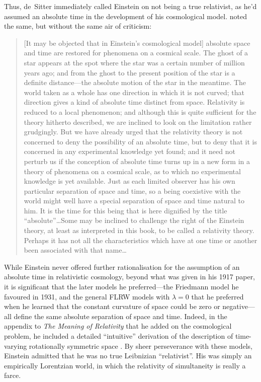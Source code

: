\documentclass[12 pt]{article}
\begin{document}
Thus, de~Sitter immediately called Einstein on not being a true relativist, as he'd assumed an absolute time in the development of his cosmological model. \citet[p.~150]{Eddington1920} noted the same, but without the same air of criticism: 
\begin{quotation}
[It may be objected that in Einstein's cosmological model] absolute space and time are restored for phenomena on a cosmical scale. The ghost of a star appears at the spot where the star was a certain number of million years ago; and from the ghost to the present position of the star is a definite distance---the absolute motion of the star in the meantime. The world taken as a whole has one direction in which it is not curved; that direction gives a kind of absolute time distinct from space. Relativity is reduced to a local phenomenon; and although this is quite sufficient for the theory hitherto described, we are inclined to look on the limitation rather grudgingly. But we have already urged that the relativity theory is not concerned to deny the possibility of an absolute time, but to deny that it is concerned in any experimental knowledge yet found; and it need not perturb us if the conception of absolute time turns up in a new form in a theory of phenomena on a cosmical scale, as to which no experimental knowledge is yet available. Just as each limited observer has his own particular separation of space and time, so a being coexistive with the world might well have a special separation of space and time natural to him. It is the time for this being that is here dignified by the title ``absolute''\ldots Some may be inclined to challenge the right of the Einstein theory, at least as interpreted in this book, to be called a relativity theory. Perhaps it has not all the characteristics which have at one time or another been associated with that name\ldots
\end{quotation}

While Einstein never offered further rationalisation for the assumption of an absolute time in relativistic cosmology, beyond what was given in his 1917 paper, it is significant that the later models he preferred---the Friedmann model he favoured in 1931, and the general FLRW models with $\lambda=0$ that he preferred when he learned that the constant curvature of space could be zero or negative---all define the same absolute separation of space and time. Indeed, in the appendix to \textit{The Meaning of Relativity} that he added on the cosmological problem, he included a detailed ``intuitive'' derivation of the description of time-varying rotationally symmetric space \citep{Einstein1945}. By sheer perseverance with these models, Einstein admitted that he was no true Leibnizian ``relativist''. His was simply an empirically Lorentzian world, in which the relativity of simultaneity is really a farce.
\end{document}
